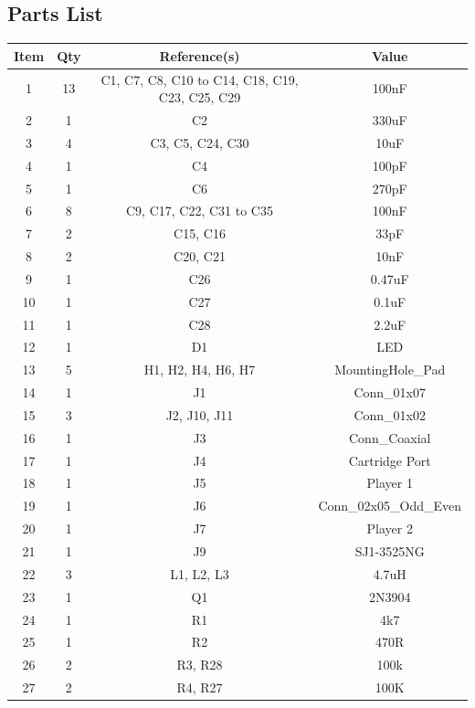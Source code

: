 \subsection{Parts List}
\begin{longtable}{ |*{4}{c|} }
\hline
{Item} & {Qty} & {Reference(s)} & {Value} \\
\hline
{1} & {13} & {C1, C7, C8, C10 to C14, C18, C19, C23, C25, C29} & {100nF} \\
\hline
{2} & {1} & {C2} & {330uF} \\
\hline
{3} & {4} & {C3, C5, C24, C30} & {10uF} \\
\hline
{4} & {1} & {C4} & {100pF} \\
\hline
{5} & {1} & {C6} & {270pF} \\
\hline
{6} & {8} & {C9, C17, C22, C31 to C35} & {100nF} \\
\hline
{7} & {2} & {C15, C16} & {33pF} \\
\hline
{8} & {2} & {C20, C21} & {10nF} \\
\hline
{9} & {1} & {C26} & {0.47uF} \\
\hline
{10} & {1} & {C27} & {0.1uF} \\
\hline
{11} & {1} & {C28} & {2.2uF} \\
\hline
{12} & {1} & {D1} & {LED} \\
\hline
{13} & {5} & {H1, H2, H4, H6, H7} & {MountingHole\_Pad} \\
\hline
{14} & {1} & {J1} & {Conn\_01x07} \\
\hline
{15} & {3} & {J2, J10, J11} & {Conn\_01x02} \\
\hline
{16} & {1} & {J3} & {Conn\_Coaxial} \\
\hline
{17} & {1} & {J4} & {Cartridge Port} \\
\hline
{18} & {1} & {J5} & {Player 1} \\
\hline
{19} & {1} & {J6} & {Conn\_02x05\_Odd\_Even} \\
\hline
{20} & {1} & {J7} & {Player 2} \\
\hline
{21} & {1} & {J9} & {SJ1-3525NG} \\
\hline
{22} & {3} & {L1, L2, L3} & {4.7uH} \\
\hline
{23} & {1} & {Q1} & {2N3904} \\
\hline
{24} & {1} & {R1} & {4k7} \\
\hline
{25} & {1} & {R2} & {470R} \\
\hline
{26} & {2} & {R3, R28} & {100k} \\
\hline
{27} & {2} & {R4, R27} & {100K} \\

\end{longtable}
